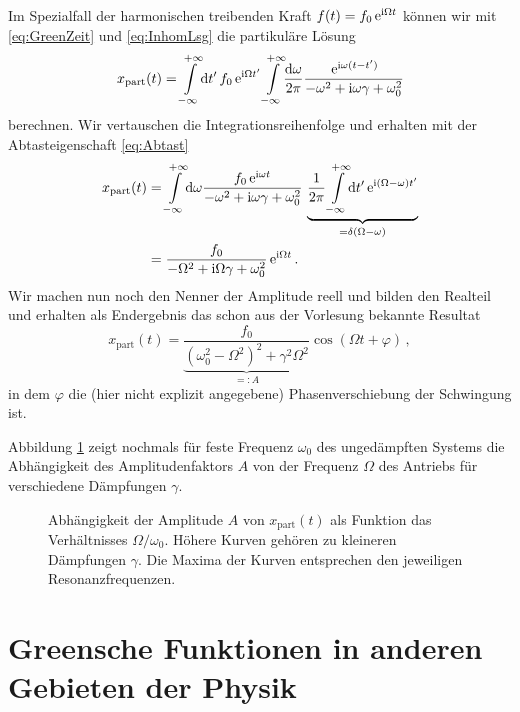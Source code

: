 \documentclass[paper=a4, fontsize=11.0pt, abstractoff, DIV12]{scrartcl}
\newcommand{\xinhom}{\ensuremath{x_\mathrm{part}}}
\begin{document}
Im Spezialfall der harmonischen treibenden Kraft $f(t) = f_0\,{\mathrm{e}}^{\mathrm{i}\Omega t}$
können wir mit \eqref{eq:GreenZeit} und \eqref{eq:InhomLsg} die partikuläre
Lösung
\begin{equation}
\xinhom(t) = \int\limits_{-\infty}^{+\infty}\!\dd t'\,f_0\eto{\ii\Omega t'} \int\limits_{-\infty}^{+\infty}\!\frac{\dd\omega}{2\pi}\frac{\eto{\ii\omega(t- t')}}{-\omega^2 + \ii\omega\gamma + \omega_0^2}
\end{equation}
berechnen. Wir vertauschen die Integrationsreihenfolge und erhalten mit der
Abtasteigenschaft \eqref{eq:Abtast}
\begin{align}
\xinhom(t) &= \int\limits_{-\infty}^{+\infty}\!{\dd\omega}\frac{f_0 \eto{\ii\omega t}}{-\omega^2 + \ii\omega\gamma + \omega_0^2}\,\underbrace{\frac{1}{2\pi}\int\limits_{-\infty}^{+\infty}\!\dd t' \eto{\ii (\Omega-\omega)t'}}_{=\delta(\Omega-\omega)}\\
&=\frac{f_0}{-\Omega^2 + \ii\Omega\gamma + \omega_0^2}\eto{\ii\Omega t}\,.
\end{align}
Wir machen nun noch den Nenner der Amplitude reell und bilden den Realteil und
erhalten als Endergebnis das schon aus der Vorlesung bekannte Resultat
\begin{equation}
\xinhom(t) = \underbrace{\frac{f_0}{(\omega_0^2 - \Omega^2)^2 + \gamma^2\Omega^2}}_{=: A}\cos(\Omega t + \varphi)\,,
\end{equation}
in dem $\varphi$ die (hier nicht explizit angegebene) Phasenverschiebung der Schwingung
ist.

Abbildung \ref{fig:Ampls} zeigt nochmals für feste Frequenz $\omega_0$ des
ungedämpften Systems die Abhängigkeit des Amplitudenfaktors $A$ von der
Frequenz $\Omega$ des Antriebs für verschiedene Dämpfungen $\gamma$.
\begin{figure}[tb]
    \centering
    
    \caption{Abhängigkeit der Amplitude $A$ von $\xinhom(t)$ als Funktion das
    Verhältnisses $\Omega/\omega_0$. Höhere Kurven gehören zu kleineren
    Dämpfungen $\gamma$. Die Maxima der Kurven entsprechen den jeweiligen
    Resonanzfrequenzen.}
    \label{fig:Ampls}
\end{figure}


\section{Greensche Funktionen in anderen Gebieten der Physik}
\end{document}
